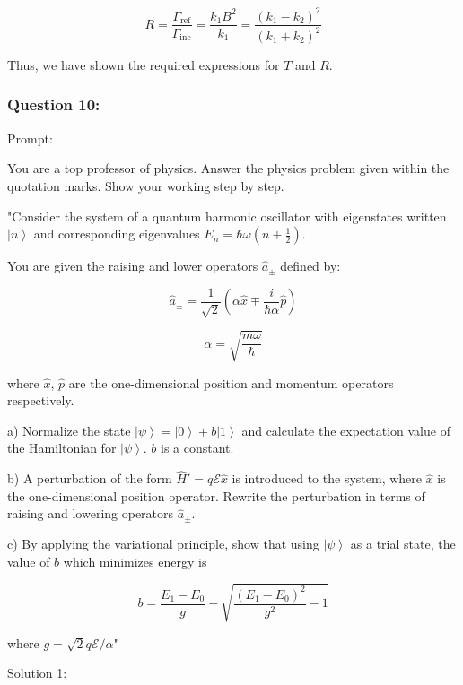 \documentclass[a4paper,11pt]{article}
\begin{document}
\[
R = \frac{\Gamma_{\text{ref}}}{\Gamma_{\text{inc}}} = \frac{k_1B^2}{k_1} = \frac{(k_1-k_2)^2}{(k_1+k_2)^2}
\]

Thus, we have shown the required expressions for \(T\) and \(R\).

\subsubsection*{Question 10:}

Prompt:
\begin{spverbatim}
    You are a top professor of physics. Answer the physics problem given within the quotation marks. Show your working step by step.

    "Consider the system of a quantum harmonic oscillator with eigenstates written \( \left| n \right> \) and corresponding eigenvalues \( E_{n} = \hbar\omega(n+\frac{1}{2}) \).

    You are given the raising and lower operators \( \hat{a}_{\pm} \) defined by:

    \[ \hat{a}_{\pm} = \frac{1}{\sqrt{2}}(\alpha \hat{x} \mp \frac{i}{\hbar\alpha} \hat{p}) \]

    \[ \alpha = \sqrt{\frac{m\omega}{\hbar}} \]

    where \( \hat{x} \), \( \hat{p} \) are the one-dimensional position and momentum operators respectively.

    a) Normalize the state \( \left| \psi \right> =  \left| 0 \right> + b \left| 1 \right> \) and calculate the expectation value of the Hamiltonian for \( \left| \psi \right> \). \( b \) is a constant.

    b) A perturbation of the form \( \hat{H}' = q \mathcal{E} \hat{x} \) is introduced to the system, where \( \hat{x} \) is the one-dimensional position operator. Rewrite the perturbation in terms of raising and lowering operators \( \hat{a}_{\pm} \).

    c) By applying the variational principle, show that using \( \left| \psi \right> \) as a trial state, the value of \( b \) which minimizes energy is 

    \[ b = \frac{E_{1} - E_{0}}{g} - \sqrt{\frac{(E_{1} - E_{0})^{2}}{g^{2}} -1} \]

    where \( g = \sqrt{2} q \mathcal{E} / {\alpha} \)"
\end{spverbatim}

\bigskip

\noindent Solution 1: \\ 
\end{document}
